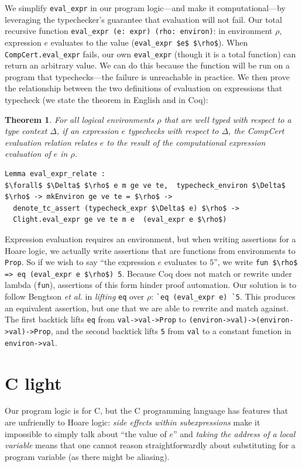 \documentclass{puthesis}
\begin{document}
We simplify \lstinline|eval_expr| in our program logic---and make it
computational---by leveraging the typechecker's guarantee that
evaluation will not fail.  Our total recursive function
\lstinline|eval_expr (e: expr) (rho: environ)|: in environment $\rho$,
expression $e$ evaluates to the value 
(\lstinline|eval_expr $e$ $\rho$|).  When \lstinline{CompCert.eval_expr} fails, our own
\lstinline{eval_expr} (though it is a total function) can return an
arbitrary value.  We can do this because the function will be run on a
program that typechecks---the failure is unreachable in practice. We
then prove the relationship between the two definitions of evaluation
on expressions that typecheck (we state the theorem in English and in
Coq):
\newtheorem{eval_expr_relate}{Theorem}
\begin{eval_expr_relate}
For all logical environments $\rho$ that are well typed with respect to a type
context $\Delta$, if an expression $e$ typechecks with respect to $\Delta$, the
CompCert evaluation relation relates $e$ to the result of the computational
expression evaluation of $e$ in $\rho$. 
\end{eval_expr_relate}

\begin{lstlisting}
Lemma eval_expr_relate :
$\forall$ $\Delta$ $\rho$ e m ge ve te,  typecheck_environ $\Delta$ $\rho$ -> mkEnviron ge ve te = $\rho$ ->
  denote_tc_assert (typecheck_expr $\Delta$ e) $\rho$ ->
  Clight.eval_expr ge ve te m e  (eval_expr e $\rho$)
\end{lstlisting}

Expression evaluation requires an environment, but when writing
assertions for a Hoare logic, we actually write assertions that are
functions from environments to \lstinline|Prop|. So if we wish to say
``the expression $e$ evaluates to $5$'', we write 
\lstinline|fun $\rho$ => eq (eval_expr e $\rho$) 5|.  Because Coq does not match or
rewrite under lambda (\lstinline|fun|), assertions of this form hinder
proof automation.  Our solution is to follow Bengtson \emph{et al.}
\cite{bengtson12:Charge} in \emph{lifting} \lstinline|eq| over $\rho$:
\lstinline|`eq (eval_expr e) `5|.  This produces an equivalent
assertion, but one that we are able to rewrite and match against. The
first backtick lifts \lstinline|eq| from \lstinline{val->val->Prop} to
\lstinline{(environ->val)->(environ->val)->Prop}, and the second
backtick lifts \lstinline{5} from \lstinline{val} to a constant
function in \lstinline{environ->val}.


\section{C light}
\label{sec:clight}
Our program logic is for C, but the C programming language has features that are
unfriendly to Hoare logic: \emph{side effects within subexpressions} 
make it impossible to simply talk about ``the value of $e$''  and \emph{taking
the address of a local variable} means that one cannot reason straightforwardly about
substituting for a program variable
(as there might be aliasing).
\end{document}
